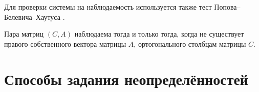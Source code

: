 Для проверки системы на наблюдаемость используется также тест Попова--Белевича--Хаутуса \cite{Sontag1998}.

\begin{lemma}
	Пара матриц $(C, A)$ наблюдаема тогда и только тогда, когда не существует правого собственного вектора матрицы $A$, ортогонального столбцам матрицы $C$.
\end{lemma}

\chapter{Способы задания неопределённостей}\label{app:С}